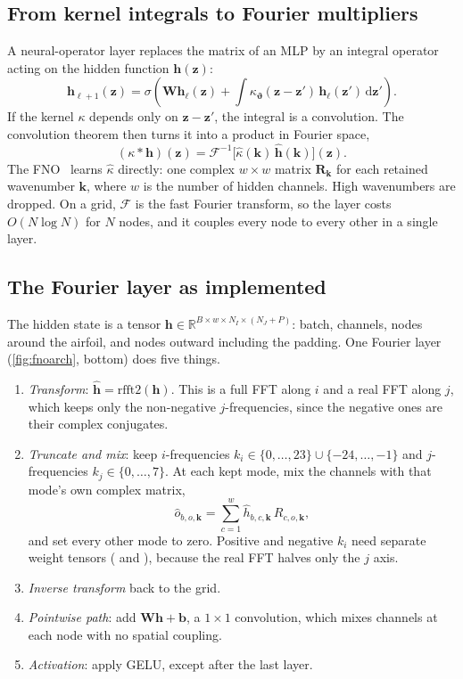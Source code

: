 \subsection{From kernel integrals to Fourier multipliers}

A neural-operator layer replaces the matrix of an MLP by an integral operator acting on the hidden
function $\bm h(\bm z)$:
\begin{equation}
  \bm h_{\ell+1}(\bm z) = \sigma\!\left(\bm W\bm h_\ell(\bm z) + \int\kappa_{\bm\vartheta}(\bm z - \bm z')\,\bm h_\ell(\bm z')\,\mathrm d\bm z'\right).
\end{equation}
If the kernel $\kappa$ depends only on $\bm z - \bm z'$, the integral is a convolution. The
convolution theorem then turns it into a product in Fourier space,
\begin{equation}
  (\kappa * \bm h)(\bm z) = \mathcal F^{-1}\bigl[\hat\kappa(\bm k)\,\hat{\bm h}(\bm k)\bigr](\bm z).
\end{equation}
The FNO~\cite{li2021fno} learns $\hat\kappa$ directly: one complex $w\times w$ matrix
$\bm R_{\bm k}$ for each retained wavenumber $\bm k$, where $w$ is the number of hidden channels.
High wavenumbers are dropped. On a grid, $\mathcal F$ is the fast Fourier transform, so the layer
costs $O(N\log N)$ for $N$ nodes, and it couples every node to every other in a single layer.

\subsection{The Fourier layer as implemented}

The hidden state is a tensor $\bm h\in\mathbb R^{B\times w\times N_I\times(N_J+P)}$: batch,
channels, nodes around the airfoil, and nodes outward including the padding. One Fourier layer
(\cref{fig:fnoarch}, bottom) does five things.
\begin{enumerate}
  \item \emph{Transform}: $\hat{\bm h} = \mathrm{rfft2}(\bm h)$. This is a full FFT along $i$ and a
    real FFT along $j$, which keeps only the non-negative $j$-frequencies, since the negative ones
    are their complex conjugates.
  \item \emph{Truncate and mix}: keep $i$-frequencies $k_i\in\{0,\dots,23\}\cup\{-24,\dots,-1\}$
    and $j$-frequencies $k_j\in\{0,\dots,7\}$. At each kept mode, mix the channels with that mode's
    own complex matrix,
    \begin{equation}
      \hat o_{b,o,\bm k} = \sum_{c=1}^{w}\hat h_{b,c,\bm k}\,R_{c,o,\bm k},
    \end{equation}
    and set every other mode to zero. Positive and negative $k_i$ need separate weight tensors
    ( and ), because the real FFT halves only the $j$ axis.
  \item \emph{Inverse transform} back to the grid.
  \item \emph{Pointwise path}: add $\bm W\bm h + \bm b$, a $1\times1$ convolution, which mixes
    channels at each node with no spatial coupling.
  \item \emph{Activation}: apply GELU, except after the last layer.
\end{enumerate}

